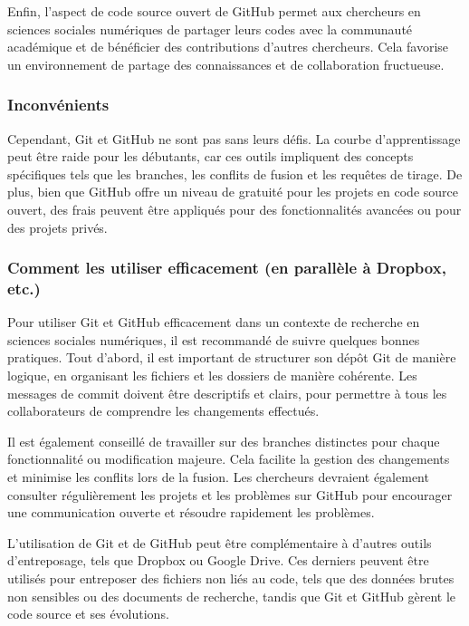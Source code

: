 \documentclass[
  letterpaper,
]{scrbook}
\begin{document}
Enfin, l'aspect de code source ouvert de GitHub permet aux chercheurs en
sciences sociales numériques de partager leurs codes avec la communauté
académique et de bénéficier des contributions d'autres chercheurs. Cela
favorise un environnement de partage des connaissances et de
collaboration fructueuse.

\hypertarget{inconvuxe9nients}{%
\subsubsection{Inconvénients}\label{inconvuxe9nients}}

Cependant, Git et GitHub ne sont pas sans leurs défis. La courbe
d'apprentissage peut être raide pour les débutants, car ces outils
impliquent des concepts spécifiques tels que les branches, les conflits
de fusion et les requêtes de tirage. De plus, bien que GitHub offre un
niveau de gratuité pour les projets en code source ouvert, des frais
peuvent être appliqués pour des fonctionnalités avancées ou pour des
projets privés.

\hypertarget{comment-les-utiliser-efficacement-en-paralluxe8le-uxe0-dropbox-etc.}{%
\subsubsection{Comment les utiliser efficacement (en parallèle à
Dropbox,
etc.)}\label{comment-les-utiliser-efficacement-en-paralluxe8le-uxe0-dropbox-etc.}}

Pour utiliser Git et GitHub efficacement dans un contexte de recherche
en sciences sociales numériques, il est recommandé de suivre quelques
bonnes pratiques. Tout d'abord, il est important de structurer son dépôt
Git de manière logique, en organisant les fichiers et les dossiers de
manière cohérente. Les messages de commit doivent être descriptifs et
clairs, pour permettre à tous les collaborateurs de comprendre les
changements effectués.

Il est également conseillé de travailler sur des branches distinctes
pour chaque fonctionnalité ou modification majeure. Cela facilite la
gestion des changements et minimise les conflits lors de la fusion. Les
chercheurs devraient également consulter régulièrement les projets et
les problèmes sur GitHub pour encourager une communication ouverte et
résoudre rapidement les problèmes.

L'utilisation de Git et de GitHub peut être complémentaire à d'autres
outils d'entreposage, tels que Dropbox ou Google Drive. Ces derniers
peuvent être utilisés pour entreposer des fichiers non liés au code,
tels que des données brutes non sensibles ou des documents de recherche,
tandis que Git et GitHub gèrent le code source et ses évolutions.
\end{document}
